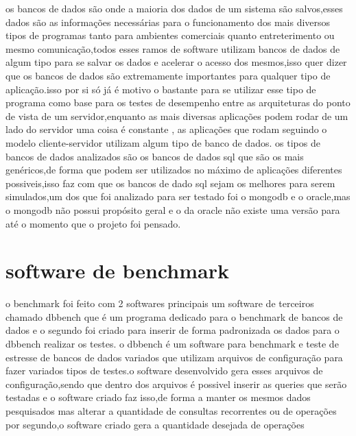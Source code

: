 \documentclass[
	12pt,				%
	openright,			%
	oneside,			%
	a4paper,			%
	english,			%
	french,				%
	spanish,			%
	brazil,				%
	]{abntex2}
\begin{document}
os bancos de dados são onde a maioria dos dados de um sistema são salvos,esses dados são as informações necessárias para o funcionamento dos mais diversos tipos de programas tanto para ambientes comerciais quanto entreterimento ou mesmo comunicação,todos esses ramos de software utilizam bancos de dados de algum tipo para se salvar os dados e acelerar o acesso dos mesmos,isso quer dizer que os bancos de dados são extremamente importantes para qualquer tipo de aplicação.isso por si só já é motivo o bastante para se utilizar esse tipo de programa como base para os testes de desempenho entre as arquiteturas do ponto de vista de um servidor,enquanto as mais diversas aplicações podem rodar de um lado do servidor uma coisa é constante , as aplicações que rodam seguindo o modelo cliente-servidor utilizam algum tipo de banco de dados.\newline
os tipos de bancos de dados analizados são os bancos de dados sql que são os mais genéricos,de forma que podem ser utilizados no máximo de aplicações diferentes possiveis,isso faz com que os bancos de dado sql sejam os melhores para serem simulados,um dos que foi analizado para ser testado foi o mongodb e o oracle,mas o mongodb não possui propósito geral e o da oracle não existe uma versão para  até o momento que o projeto foi pensado.

\section{software de benchmark}
\label{sec: software de benchmark}
o benchmark foi feito com 2 softwares principais um software de terceiros chamado dbbench que é um programa dedicado para o benchmark de bancos de dados e o segundo foi criado para inserir de forma padronizada os dados para o dbbench realizar os testes.
o dbbench é um software para benchmark e teste de estresse de bancos de dados variados que utilizam arquivos de configuração para fazer variados tipos de testes.o software desenvolvido gera esses arquivos de configuração,sendo que dentro dos arquivos é possivel inserir as queries que serão testadas e o software criado faz isso,de forma a manter os mesmos dados pesquisados mas alterar a quantidade de consultas recorrentes ou de operações por segundo,o software criado gera a quantidade desejada de operações 
\end{document}
